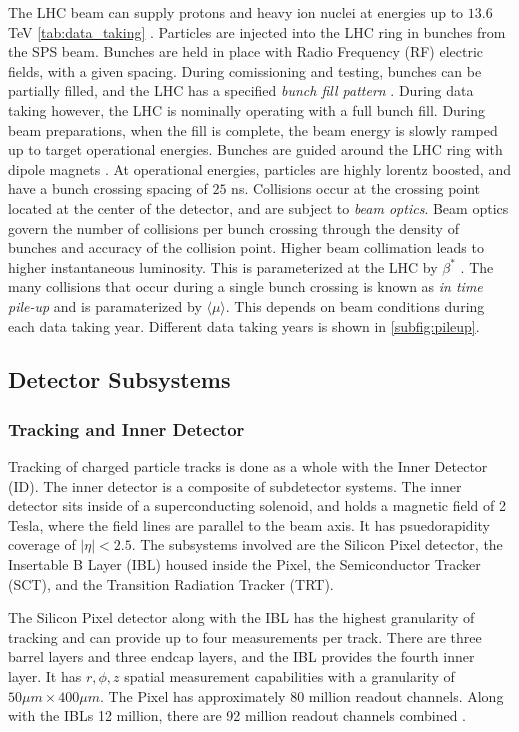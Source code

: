 \documentclass[12pt]{article}
\begin{document}
The LHC beam can supply protons and heavy ion nuclei at energies up to $13.6$
TeV \ref{tab:data_taking} \cite{Aad_2024}. Particles are injected into the LHC
ring in bunches from the SPS beam. Bunches are held in place with Radio
Frequency (RF) electric fields, with a given spacing. During comissioning and
testing, bunches can be partially filled, and the LHC has a specified
\textit{bunch fill pattern} \cite{bunch_filling_schemes_bailey}. During data
taking however, the LHC is nominally operating with a full bunch fill. During
beam preparations, when the fill is complete, the beam energy is slowly ramped
up to target operational energies. Bunches are guided around the LHC ring with
dipole magnets \cite{The_ATLAS_Collaboration_2008,
bunch_filling_schemes_bailey}. At operational energies, particles are highly
lorentz boosted, and have a bunch crossing spacing of $25$ ns. Collisions occur
at the crossing point located at the center of the detector, and are subject to
\textit{beam optics}. Beam optics govern the number of collisions per bunch
crossing through the density of bunches and accuracy of the collision point.
Higher beam collimation leads to higher instantaneous luminosity. This is
parameterized at the LHC by $\beta^*$ \cite{Aad_2024}. The many collisions that
occur during a single bunch crossing is known as \textit{in time pile-up} and is
paramaterized by $\langle\mu\rangle$. This depends on beam conditions during
each data taking year. Different data taking years is shown in \ref{subfig:pileup}. 

\subsection{Detector Subsystems} \label{sec:detector_subsystems}
\subsubsection{Tracking and Inner Detector}
Tracking of charged particle tracks is done as a whole with the Inner Detector
(ID). The inner detector is a composite of subdetector systems. The inner
detector sits inside of a superconducting solenoid, and holds a magnetic field
of 2 Tesla, where the field lines are parallel to the beam axis. It has
psuedorapidity coverage of $|\eta| < 2.5$. The subsystems involved are the
Silicon Pixel detector, the Insertable B Layer (IBL) housed inside the Pixel,
the Semiconductor Tracker (SCT), and the Transition Radiation Tracker (TRT).

The Silicon Pixel detector along with the IBL has the highest granularity of
tracking and can provide up to four measurements per track. There are three
barrel layers and three endcap layers, and the IBL provides the fourth inner
layer. It has $r, \phi, z$ spatial measurement capabilities with a granularity
of $50 \mu m \times 400 \mu m$. The Pixel has approximately 80 million readout
channels. Along with the IBLs 12 million, there are 92 million readout channels
combined \cite{Aad_2024}.
\end{document}
